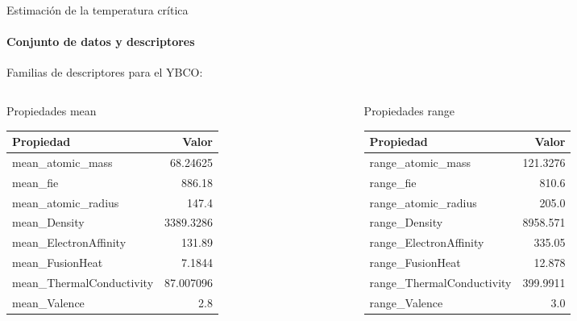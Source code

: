 \documentclass{beamer}
\begin{document}
\begin{frame}{\LARGE Estimación de la temperatura crítica}
    \framesubtitle{Conjunto de datos y descriptores}
    Familias de descriptores para el YBCO:
    \begin{columns}[t]

\begin{column}{0.5\textwidth}
\begin{block}{Propiedades mean}
\begin{footnotesize}
\begin{tabular}{lr}
\hline
\textbf{Propiedad} & \textbf{Valor} \\
\hline
mean\_atomic\_mass & 68.24625 \\
mean\_fie & 886.18 \\
mean\_atomic\_radius & 147.4 \\
mean\_Density & 3389.3286 \\
mean\_ElectronAffinity & 131.89 \\
mean\_FusionHeat & 7.1844 \\
mean\_ThermalConductivity & 87.007096 \\
mean\_Valence & 2.8 \\
\hline
\end{tabular}
\end{footnotesize}
\end{block}
\end{column}

\begin{column}{0.5\textwidth}
\begin{block}{Propiedades range}
\begin{footnotesize}
\begin{tabular}{lr}
\hline
\textbf{Propiedad} & \textbf{Valor} \\
\hline
range\_atomic\_mass & 121.3276 \\
range\_fie & 810.6 \\
range\_atomic\_radius & 205.0 \\
range\_Density & 8958.571 \\
range\_ElectronAffinity & 335.05 \\
range\_FusionHeat & 12.878 \\
range\_ThermalConductivity & 399.9911 \\
range\_Valence & 3.0 \\
\hline
\end{tabular}
\end{footnotesize}
\end{block}
\end{column}
\end{columns}


\end{frame}
\end{document}
